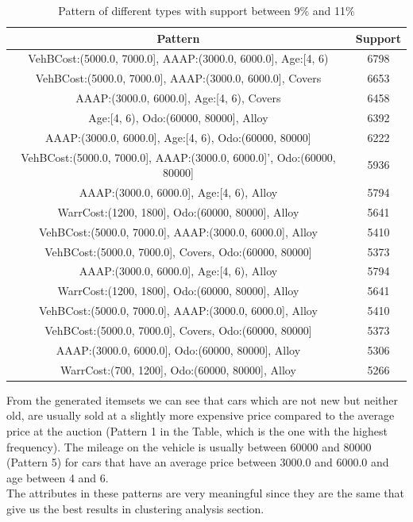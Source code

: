 \documentclass{article}
\begin{document}
	\begin{table}[H]
		\centering
		\begin{tabular}{|c|c|}
			\hline
			\textbf{Pattern} & \textbf{Support} \\
			\hline
			\rowcolor{Gray}
			VehBCost:(5000.0, 7000.0], AAAP:(3000.0, 6000.0], Age:[4, 6) &  6798\\
			VehBCost:(5000.0, 7000.0], AAAP:(3000.0, 6000.0], Covers &  6653\\
			\rowcolor{Gray}
			AAAP:(3000.0, 6000.0], Age:[4, 6), Covers &  6458\\
			Age:[4, 6), Odo:(60000, 80000], Alloy &  6392\\
			\rowcolor{Gray}
			AAAP:(3000.0, 6000.0], Age:[4, 6), Odo:(60000, 80000] &  6222\\
			VehBCost:(5000.0, 7000.0], AAAP:(3000.0, 6000.0]', Odo:(60000, 80000]  & 5936\\
			\rowcolor{Gray}
			AAAP:(3000.0, 6000.0], Age:[4, 6), Alloy &  5794\\
			WarrCost:(1200, 1800], Odo:(60000, 80000], Alloy & 5641\\
			\rowcolor{Gray}
			VehBCost:(5000.0, 7000.0], AAAP:(3000.0, 6000.0], Alloy &  5410\\
			VehBCost:(5000.0, 7000.0], Covers, Odo:(60000, 80000] & 5373\\
			\rowcolor{Gray}
			AAAP:(3000.0, 6000.0], Age:[4, 6), Alloy & 5794\\
			WarrCost:(1200, 1800], Odo:(60000, 80000], Alloy & 5641\\
			\rowcolor{Gray}
			VehBCost:(5000.0, 7000.0], AAAP:(3000.0, 6000.0], Alloy & 5410\\
			VehBCost:(5000.0, 7000.0], Covers, Odo:(60000, 80000] & 5373\\
			\rowcolor{Gray}
			AAAP:(3000.0, 6000.0], Odo:(60000, 80000], Alloy & 5306\\
			WarrCost:(700, 1200], Odo:(60000, 80000], Alloy & 5266\\\hline
		\end{tabular}
		\caption{Pattern of different types with support between 9\% and 11\%}
		\label{tab:boh}
	\end{table}
	
	From the generated itemsets we can see that cars which are not new but neither old, are usually sold at a slightly more expensive price compared to the average price at the auction (Pattern 1 in the Table, which is the one with the highest frequency). The mileage on the vehicle is usually between 60000 and 80000 (Pattern 5) for cars that have an average price between 3000.0 and 6000.0 and age between 4 and 6.\\ %
	The attributes in these patterns are very meaningful since they are the same that give us the best results in clustering analysis section. 
	
\end{document}
